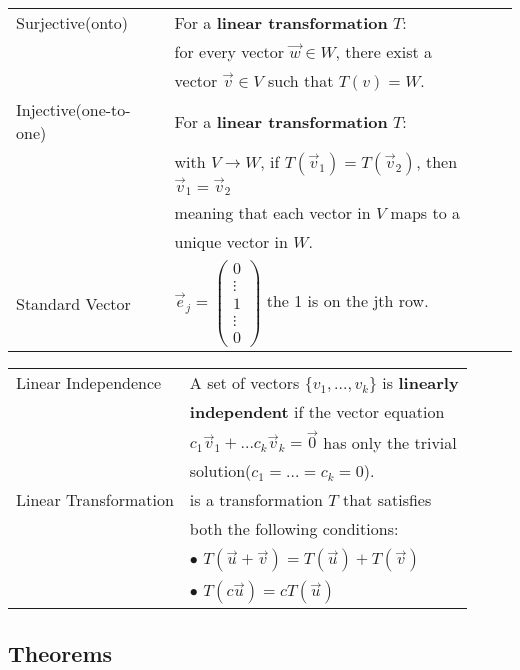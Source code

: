 \documentclass[5pt]{article}
\begin{document}
\begin{multicols}{2}
\begin{tabular}{ll}
                            
\small{Surjective}\footnotesize{(onto)}                  & For a \textbf{linear transformation} $T$:\\
                            & for every vector $\vec{w}\in W$, there exist a\\
                            & vector $\vec{v}\in V$ such that $T(v)=W$.\\
\small{Injective}\footnotesize{(one-to-one)}                   & For a \textbf{linear transformation} $T$:\\
                            & with $V\rightarrow W$, if $T(\vec{v}_1)=T(\vec{v}_2)$, then $\vec{v}_1=\vec{v}_2$\\
                            & meaning that each vector in $V$ maps to a\\
                            & unique vector in $W$.\\
Standard Vector             & $\vec{e}_j=$\footnotesize{$\begin{pmatrix}0\\ \vdots\\ 1\\ \vdots\\ 0\end{pmatrix}$} the 1 is on the jth row.\\
\end{tabular}
\begin{tabular}{ll}
Linear Independence   & A set of vectors $\{v_1, ..., v_k\}$ is \textbf{linearly}\\
                      & \textbf{independent} if the vector equation\\
                      & $c_1\vec{v}_1 + ... c_k\vec{v}_k=\vec{0}$ has only the trivial\\
                      & solution($c_1=...=c_k=0$).\\
Linear Transformation & is a transformation $T$ that satisfies\\
                      & both the following conditions:\\
                      & $\bullet$ $T(\vec{u}+\vec{v}) = T(\vec{u}) + T(\vec{v})$\\
                      & $\bullet$ $T(c\vec{u})=cT(\vec{u})$\\
\end{tabular}

\subsection{Theorems}
\newtheorem{theorem}{Theorem}
\newtheorem{properties}{Properties}


\end{multicols}
\end{document}
